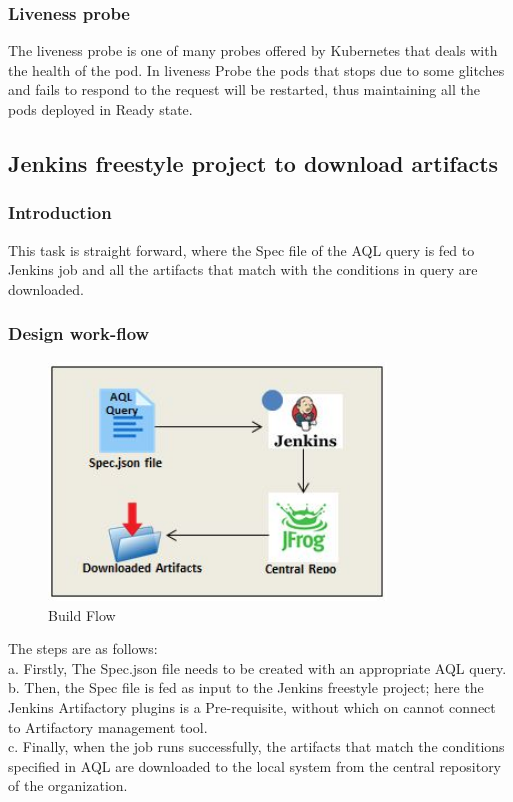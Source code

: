 \documentclass[12pt]{article}
\begin{document}
	\subsubsection{Liveness probe}
	
	The liveness probe is one of many probes offered by Kubernetes that deals with the health of the pod. In liveness Probe the pods that stops due to some glitches and fails to respond to the request will be restarted, thus maintaining all the pods deployed in Ready state.	
	
	\subsection{Jenkins freestyle project to download artifacts}
	

	
	\subsubsection{Introduction}
	
This task is straight forward, where the Spec file of the AQL query is fed to Jenkins job and all the artifacts that match with the conditions in query are downloaded.		
	
	\subsubsection{Design work-flow}

\begin{figure}[htbp]
\begin{center}
\includegraphics[width=0.8\textwidth]{jj.jpg}
\end{center}
\caption{Build Flow}
\end{figure}	
	
The steps are as follows:\\
a.	Firstly, The Spec.json file needs to be created with an appropriate AQL query.\\
b.	Then, the Spec file is fed as input to the Jenkins freestyle project; here the Jenkins Artifactory plugins is a Pre-requisite, without which on cannot connect to Artifactory management tool.\\
c.	Finally, when the job runs successfully, the artifacts that match the conditions specified in AQL are downloaded to the local system from the central repository of the organization. 
	
\end{document}
